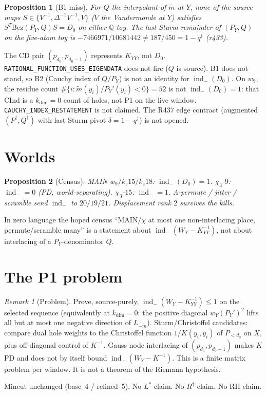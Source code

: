\documentclass[11pt]{article}
\newtheorem{prop}{Proposition}
\theoremstyle{remark}
\newtheorem{remark}{Remark}
\newcommand{\indm}{\operatorname{ind}_{-}}
\begin{document}
\begin{prop}[B1 miss]\label{prop:bezout}
For $Q$ the interpolant of $\widetilde{m}$ at $Y$, none of
the source maps $S\in\{V^{-1},\Delta^{-1}V^{-1},V\}$
($V$ the Vandermonde at $Y$) satisfies
$S^T\mathrm{Bez}(P_Y,Q)S=D_0$ on either $\mathbb{Q}$-toy.
The last Sturm remainder of $(P_Y,Q)$ on the five-atom
toy is $-7466971/10681442\neq 187/450=1-q^\dagger$ (r433).
\end{prop}

The CD pair $(p_{d_0},p_{d_0-1})$ represents $K_{YY}$,
not $D_0$.
\texttt{RATIONAL\_FUNCTION\_USES\_EIGENDATA} does not fire
($Q$ is source).
B1 does not stand, so B2 (Cauchy index of $Q/P_Y$) is not
an identity for $\indm(D_0)$.
On $w_9$, the residue count $\#\{i:\widetilde{m}(y_i)/P_Y'(y_i)<0\}=52$
is not $\indm(D_0)=1$: that CInd is a $k_{\dim}=0$ count
of holes, not P1 on the live window.
\texttt{CAUCHY\_INDEX\_RESTATEMENT} is not claimed.
The R437 edge contract (augmented $(P^\dagger,Q^\dagger)$
with last Sturm pivot $\delta=1-q^\dagger$) is not opened.

\section{Worlds}

\begin{prop}[Census]\label{prop:census}
MAIN $w_9/k_z15/k_z18$: $\indm(D_0)=1$.
$\chi_3$-$9$: $\indm=0$ (PD, world-separating).
$\chi_3$-$15$: $\indm=1$.
$\Lambda$-permute / jitter / scramble send $\indm$ to
$20/19/21$.
Displacement rank $2$ survives the kills.
\end{prop}

In zero language the hoped census
``MAIN$/\chi$ at most one non-interlacing place, permute/scramble
many'' is a statement about $\indm(W_Y-K_{YY}^{-1})$, not
about interlacing of a $P_Y$-denominator $Q$.

\section{The P1 problem}

\begin{remark}[Problem]
Prove, source-purely, $\indm(W_Y-K_{YY}^{-1})\le 1$ on the
selected sequence (equivalently at $k_{\dim}=0$: the
positive diagonal $w_Y(P_Y')^2$ lifts all but at most one
negative direction of $L_{-\widetilde{m}}$).
Sturm/Christoffel candidates: compare dual hole weights to
the Christoffel function $1/K(y_i,y_i)$ of $P_{<d_0}$ on
$X$, plus off-diagonal control of $K^{-1}$.
Gauss-node interlacing of $(p_{d_0},p_{d_0-1})$ makes $K$
PD and does not by itself bound $\indm(W_Y-K^{-1})$.
This is a finite matrix problem per window.
It is not a theorem of the Riemann hypothesis.
\end{remark}

Mincut unchanged (base~$4$ / refined~$5$).
No $L^*$ claim.  No $R^\dagger$ claim.  No RH claim.
\end{document}
